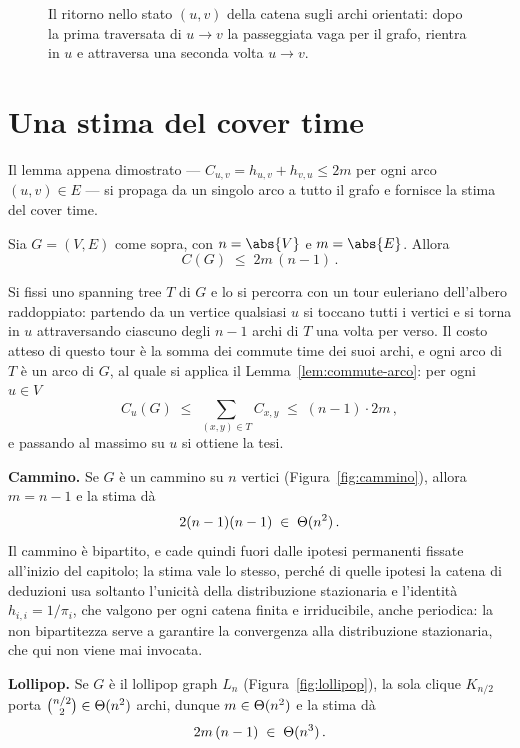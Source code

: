 \begin{figure}[H]
  \centering
  
  \caption{Il ritorno nello stato $(u,v)$ della catena sugli archi orientati: dopo la prima
  traversata di $u \to v$ la passeggiata vaga per il grafo, rientra in $u$ e attraversa una
  seconda volta $u \to v$.}
  \label{fig:ritorno-arco}
\end{figure}

\section{Una stima del cover time}


Il lemma appena dimostrato --- $C_{u,v} = h_{u,v} + h_{v,u} \le 2m$ per ogni arco
$(u,v) \in E$ --- si propaga da un singolo arco a tutto il grafo e fornisce la stima del
cover time.

\begin{teorema}\label{thm:cover-time}
  Sia $G = (V,E)$ come sopra, con $n = \abs{V}$ e $m = \abs{E}$. Allora
  \[
    C(G) \;\le\; 2m\,(n-1) \,.
  \]
\end{teorema}

\begin{dimostrazione}
  Si fissi uno spanning tree $T$ di $G$ e lo si percorra con un tour euleriano dell'albero
  raddoppiato: partendo da un vertice qualsiasi $u$ si toccano tutti i vertici e si torna in
  $u$ attraversando ciascuno degli $n-1$ archi di $T$ una volta per verso. Il costo atteso di
  questo tour è la somma dei commute time dei suoi archi, e ogni arco di $T$ è un arco di
  $G$, al quale si applica il Lemma~\ref{lem:commute-arco}: per ogni $u \in V$
  \[
    C_u(G) \;\le\; \sum_{(x,y) \in T} C_{x,y} \;\le\; (n-1) \cdot 2m \,,
  \]
  e passando al massimo su $u$ si ottiene la tesi.
\end{dimostrazione}

\begin{esempio}
  \textbf{Cammino.} Se $G$ è un cammino su $n$ vertici (Figura~\ref{fig:cammino}), allora
  $m = n-1$ e la stima dà
  \[
    2(n-1)(n-1) \;\in\; \Theta(n^2) \,.
  \]
  Il cammino è bipartito, e cade quindi fuori dalle ipotesi permanenti fissate all'inizio del
  capitolo; la stima vale lo stesso, perché di quelle ipotesi la catena di deduzioni usa
  soltanto l'unicità della distribuzione stazionaria e l'identità $h_{i,i} = 1/\pi_i$, che
  valgono per ogni catena finita e irriducibile, anche periodica: la non bipartitezza serve a
  garantire la convergenza alla distribuzione stazionaria, che qui non viene mai invocata.

  \medskip
  \textbf{Lollipop.} Se $G$ è il lollipop graph $L_n$ (Figura~\ref{fig:lollipop}), la sola
  clique $K_{n/2}$ porta $\binom{n/2}{2} \in \Theta(n^2)$ archi, dunque $m \in \Theta(n^2)$ e la
  stima dà
  \[
    2m\,(n-1) \;\in\; \Theta(n^3) \,.
  \]
\end{esempio}

